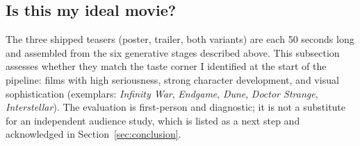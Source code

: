 \documentclass{article}
\begin{document}
\subsection{Is this my ideal movie?}

The three shipped teasers (poster, trailer, both variants) are each 50 seconds long and assembled from the six generative stages described above. This subsection assesses whether they match the taste corner I identified at the start of the pipeline: films with high seriousness, strong character development, and visual sophistication (exemplars: \emph{Infinity War}, \emph{Endgame}, \emph{Dune}, \emph{Doctor Strange}, \emph{Interstellar}). The evaluation is first-person and diagnostic; it is not a substitute for an independent audience study, which is listed as a next step and acknowledged in Section~\ref{sec:conclusion}.
\end{document}
